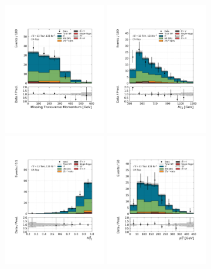 \begin{figure}[!htb]
    \centering
    \includegraphics[width=0.4\textwidth]{figures/search_hh/bkg_estimate/crvr/crtop/crtoptest_met}
    \includegraphics[width=0.4\textwidth]{figures/search_hh/bkg_estimate/crvr/crtop/crtoptest_HT2}
    \includegraphics[width=0.4\textwidth]{figures/search_hh/bkg_estimate/crvr/crtop/crtoptest_HT2Ratio}
    \includegraphics[width=0.4\textwidth]{figures/search_hh/bkg_estimate/crvr/crtop/crtoptest_pTll}

\end{figure}
